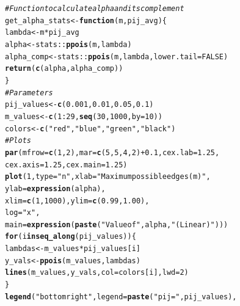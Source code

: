 \documentclass{article}\usepackage[]{graphicx}\usepackage[]{xcolor}
\makeatletter
\newcommand{\hlnum}[1]{\textcolor[rgb]{0.686,0.059,0.569}{#1}}%
\newcommand{\hlsng}[1]{\textcolor[rgb]{0.192,0.494,0.8}{#1}}%
\newcommand{\hlcom}[1]{\textcolor[rgb]{0.678,0.584,0.686}{\textit{#1}}}%
\newcommand{\hlopt}[1]{\textcolor[rgb]{0,0,0}{#1}}%
\newcommand{\hldef}[1]{\textcolor[rgb]{0.345,0.345,0.345}{#1}}%
\newcommand{\hlkwa}[1]{\textcolor[rgb]{0.161,0.373,0.58}{\textbf{#1}}}%
\newcommand{\hlkwb}[1]{\textcolor[rgb]{0.69,0.353,0.396}{#1}}%
\newcommand{\hlkwc}[1]{\textcolor[rgb]{0.333,0.667,0.333}{#1}}%
\newcommand{\hlkwd}[1]{\textcolor[rgb]{0.737,0.353,0.396}{\textbf{#1}}}%
\newenvironment{kframe}{%
 \def\at@end@of@kframe{}%
 \ifinner\ifhmode%
  \def\at@end@of@kframe{\end{minipage}}%
  \begin{minipage}{\columnwidth}%
 \fi\fi%
 \def\FrameCommand##1{\hskip\@totalleftmargin \hskip-\fboxsep
 \colorbox{shadecolor}{##1}\hskip-\fboxsep
     \hskip-\linewidth \hskip-\@totalleftmargin \hskip\columnwidth}%
 \MakeFramed {\advance\hsize-\width
   \@totalleftmargin\z@ \linewidth\hsize
   \@setminipage}}%
 {\par\unskip\endMakeFramed%
 \at@end@of@kframe}
\newenvironment{knitrout}{}{} %
\makeatother
\begin{document}
\begin{knitrout}
\color{fgcolor}\begin{kframe}
\begin{alltt}
\hlcom{# Function to calculate alpha and its complement}
\hldef{get_alpha_stats} \hlkwb{<-} \hlkwa{function}\hldef{(}\hlkwc{m}\hldef{,} \hlkwc{pij_avg}\hldef{) \{}
  \hldef{lambda} \hlkwb{<-} \hldef{m} \hlopt{*} \hldef{pij_avg}
  \hldef{alpha} \hlkwb{<-} \hldef{stats}\hlopt{::}\hlkwd{ppois}\hldef{(m, lambda)}
  \hldef{alpha_comp} \hlkwb{<-} \hldef{stats}\hlopt{::}\hlkwd{ppois}\hldef{(m, lambda,} \hlkwc{lower.tail} \hldef{=} \hlnum{FALSE}\hldef{)}
  \hlkwd{return}\hldef{(}\hlkwd{c}\hldef{(alpha, alpha_comp))}
\hldef{\}}
\hlcom{# Parameters}
\hldef{pij_values} \hlkwb{<-} \hlkwd{c}\hldef{(}\hlnum{0.001}\hldef{,} \hlnum{0.01}\hldef{,} \hlnum{0.05}\hldef{,} \hlnum{0.1}\hldef{)}
\hldef{m_values} \hlkwb{<-} \hlkwd{c}\hldef{(}\hlnum{1}\hlopt{:}\hlnum{29}\hldef{,}\hlkwd{seq}\hldef{(}\hlnum{30}\hldef{,} \hlnum{1000}\hldef{,} \hlkwc{by} \hldef{=} \hlnum{10}\hldef{))}
\hldef{colors} \hlkwb{<-} \hlkwd{c}\hldef{(}\hlsng{"red"}\hldef{,} \hlsng{"blue"}\hldef{,} \hlsng{"green"}\hldef{,} \hlsng{"black"}\hldef{)}
\hlcom{# Plots}
\hlkwd{par}\hldef{(}\hlkwc{mfrow}\hldef{=}\hlkwd{c}\hldef{(}\hlnum{1}\hldef{,} \hlnum{2}\hldef{),} \hlkwc{mar}\hldef{=}\hlkwd{c}\hldef{(}\hlnum{5}\hldef{,} \hlnum{5}\hldef{,} \hlnum{4}\hldef{,} \hlnum{2}\hldef{)} \hlopt{+} \hlnum{0.1}\hldef{,} \hlkwc{cex.lab}\hldef{=}\hlnum{1.25}\hldef{,}
    \hlkwc{cex.axis}\hldef{=}\hlnum{1.25}\hldef{,} \hlkwc{cex.main}\hldef{=}\hlnum{1.25}\hldef{)}
\hlkwd{plot}\hldef{(}\hlnum{1}\hldef{,} \hlkwc{type}\hldef{=}\hlsng{"n"}\hldef{,} \hlkwc{xlab}\hldef{=}\hlsng{"Maximum possible edges (m)"}\hldef{,}
     \hlkwc{ylab}\hldef{=}\hlkwd{expression}\hldef{(alpha),}
     \hlkwc{xlim}\hldef{=}\hlkwd{c}\hldef{(}\hlnum{1}\hldef{,} \hlnum{1000}\hldef{),} \hlkwc{ylim}\hldef{=}\hlkwd{c}\hldef{(}\hlnum{0.99}\hldef{,} \hlnum{1.00}\hldef{),}
     \hlkwc{log}\hldef{=}\hlsng{"x"}\hldef{,}
     \hlkwc{main}\hldef{=}\hlkwd{expression}\hldef{(}\hlkwd{paste}\hldef{(}\hlsng{"Value of "}\hldef{, alpha,} \hlsng{" (Linear)"}\hldef{)))}
\hlkwa{for}\hldef{(i} \hlkwa{in} \hlkwd{seq_along}\hldef{(pij_values)) \{}
  \hldef{lambdas} \hlkwb{<-} \hldef{m_values} \hlopt{*} \hldef{pij_values[i]}
  \hldef{y_vals} \hlkwb{<-} \hlkwd{ppois}\hldef{(m_values, lambdas)}
  \hlkwd{lines}\hldef{(m_values, y_vals,} \hlkwc{col}\hldef{=colors[i],} \hlkwc{lwd}\hldef{=}\hlnum{2}\hldef{)}
\hldef{\}}
\hlkwd{legend}\hldef{(}\hlsng{"bottomright"}\hldef{,} \hlkwc{legend}\hldef{=}\hlkwd{paste}\hldef{(}\hlsng{"pij ="}\hldef{, pij_values),}

\end{alltt}
\end{kframe}
\end{knitrout}
\end{document}
